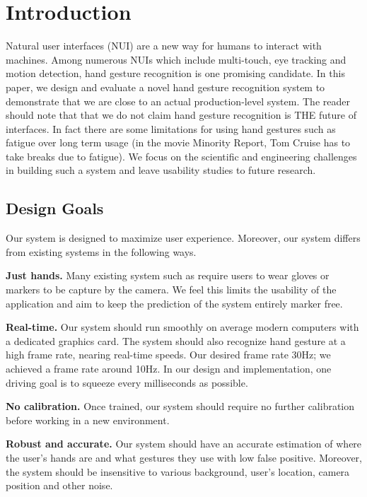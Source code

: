 \section{Introduction}
\label{sec: intro}
\cutsection

Natural user interfaces (NUI) are a new way for humans to interact with machines. Among numerous NUIs which include multi-touch, eye tracking and motion detection, hand gesture recognition is one promising candidate. In this paper, we design and evaluate a novel hand gesture recognition system to demonstrate that we are close to an actual production-level system. The reader should note that that we do not claim hand gesture recognition is THE future of interfaces. In fact there are some limitations for using hand gestures such as fatigue over long term usage (in the movie Minority Report, Tom Cruise has to take breaks due to fatigue). We focus on the scientific and engineering challenges in building such a system and leave usability studies to future research.

\cutsection
\subsection{Design Goals}
\cutsection
Our system is designed to maximize user experience. Moreover, our system differs from existing systems in the following ways.
\cutequation

\textbf{Just hands.} Many existing system such as \cite{mistry, wang2009} require users to wear gloves or markers to be capture by the camera. We feel this limits the usability of the application and aim to keep the prediction of the system entirely marker free.
\cutequation
  
\textbf{Real-time.} Our system should run smoothly on average modern computers with a dedicated graphics card. The system should also recognize hand gesture at a high frame rate, nearing real-time speeds. Our desired frame rate 30Hz; we achieved a frame rate around 10Hz. In our design and implementation, one driving goal is to squeeze every milliseconds as possible. 
\cutequation

\textbf{No calibration.}  Once trained, our system should require no further calibration before working in a new environment. 
\cutequation

\textbf{Robust and accurate.} Our system should have an accurate estimation of where the user's hands are and what gestures they use with low false positive. Moreover, the system should be insensitive to various background, user's location, camera position and other noise. 
\cutequation

